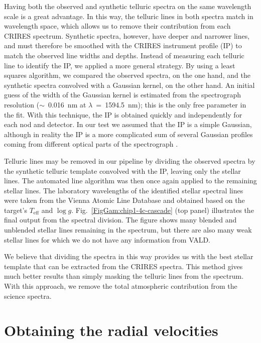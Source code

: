 \documentclass{aa}
\begin{document}
Having both the observed and synthetic telluric spectra on the same wavelength scale is a great advantage.
In this way, the telluric lines in both spectra match in wavelength space, which allows us
to remove their contribution from each CRIRES spectrum. Synthetic spectra, however, have deeper and narrower 
lines, and must therefore be smoothed with the CRIRES instrument profile (IP) to match the observed 
line widths and depths. Instead of measuring each telluric line to identify the IP, we applied a more general strategy. 
By using a least squares algorithm, we compared the observed spectra, on the one hand, and 
the synthetic spectra convolved with a Gaussian kernel, on the other hand.
An initial guess of the width of the Gaussian kernel is estimated
from the spectrograph resolution ($\sim$~0.016~nm at $\lambda$~=~1594.5~nm); this is the only free parameter in the fit.
With this technique, the IP is obtained quickly and independently for each nod and detector. 
In our test we assumed that the IP is a simple Gaussian, although in reality 
the IP is a more complicated sum of several Gaussian profiles
coming from different optical parts of the spectrograph \citep{Butler, Bean2010}.
 

Telluric lines may be removed in our pipeline by dividing the observed spectra 
by the synthetic telluric template convolved with the IP, leaving only the stellar lines.
The automated line algorithm was then once again applied to the remaining stellar lines.
The laboratory wavelengths of the identified stellar spectral 
lines were taken from the Vienna Atomic Line Database \citep[VALD,][]{Kupka} and obtained based on 
the target's $T_{\mathrm{eff}}$ and $\log g$. 
Fig.~\ref{FigGam:chip1-4c-cascade} (top panel) illustrates the final output from the spectral division. 
The figure shows many blended and unblended stellar lines remaining in the spectrum, 
but there are also many weak stellar lines for which we do not have any information from VALD.

We believe that dividing the spectra in this way provides us with the best
stellar template that can be extracted from the CRIRES spectra.
This method gives much better results than simply masking the telluric lines from the spectrum. 
With this approach, we remove the total atmospheric contribution from the science spectra. 


\section{Obtaining the radial velocities}
\label{Obtaining the radial velocities}
\end{document}
